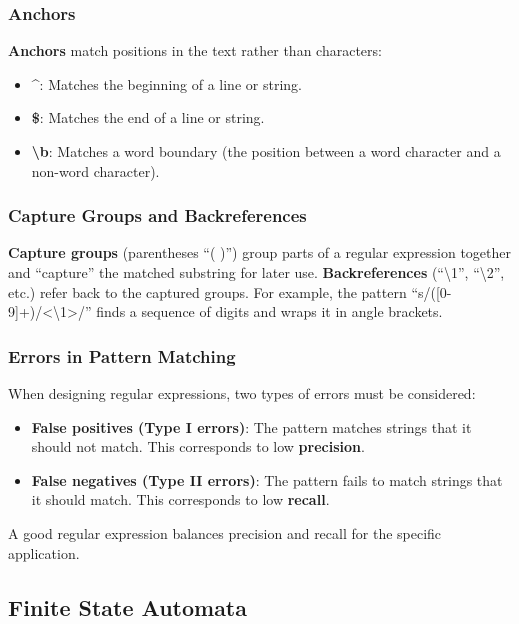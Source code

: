 \documentclass[11pt,a4paper]{article}
\begin{document}
\subsubsection{Anchors}

\textbf{Anchors} match positions in the text rather than characters:
\begin{itemize}
    \item \textbf{\^{}}: Matches the beginning of a line or string.
    \item \textbf{\$}: Matches the end of a line or string.
    \item \textbf{\textbackslash b}: Matches a word boundary (the position between a word character and a non-word character).
\end{itemize}

\subsubsection{Capture Groups and Backreferences}

\textbf{Capture groups} (parentheses ``( )'') group parts of a regular expression together and ``capture'' the matched substring for later use. \textbf{Backreferences} (``\textbackslash 1'', ``\textbackslash 2'', etc.) refer back to the captured groups. For example, the pattern ``s/([0-9]+)/<\textbackslash 1>/'' finds a sequence of digits and wraps it in angle brackets.

\subsubsection{Errors in Pattern Matching}

When designing regular expressions, two types of errors must be considered:
\begin{itemize}
    \item \textbf{False positives (Type I errors)}: The pattern matches strings that it should not match. This corresponds to low \textbf{precision}.
    \item \textbf{False negatives (Type II errors)}: The pattern fails to match strings that it should match. This corresponds to low \textbf{recall}.
\end{itemize}

A good regular expression balances precision and recall for the specific application.

\subsection{Finite State Automata}
\end{document}
